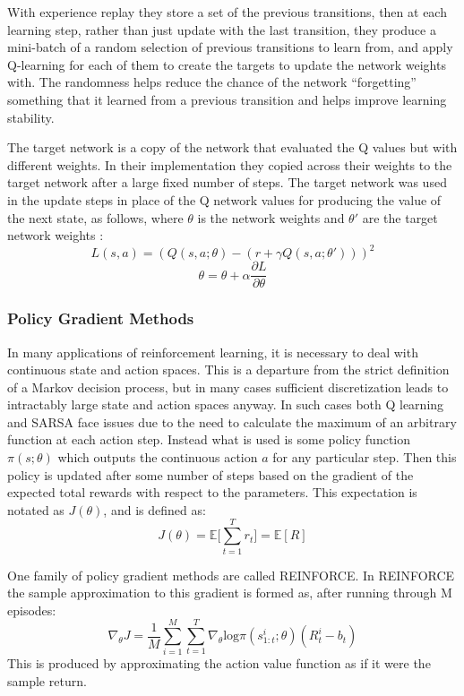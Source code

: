 With experience replay they store a set of the previous transitions, then at each learning step, rather than just update with the last transition, they produce a mini-batch of a random selection of previous transitions to learn from, and apply Q-learning for each of them to create the targets to update the network weights with. The randomness helps reduce the chance of the network ``forgetting'' something that it learned from a previous transition and helps improve learning stability. 

The target network is a copy of the network that evaluated the Q values  but with different weights. In their implementation they copied across their weights to the target network after a large fixed number of steps. The target network was used in the update steps in place of the Q network values for producing the value of the next state, as follows, where $\theta$ is the network weights and $\theta'$ are the target network weights :
\begin{equation*}
L(s,a) = (Q(s,a;\theta) - (r + \gamma Q(s,a; \theta' )))^2
\end{equation*}
\begin{equation}
\theta = \theta + \alpha \frac{\partial L}{\partial \theta}
\end{equation}

\subsubsection{Policy Gradient Methods}
In many applications of reinforcement learning, it is necessary to deal with continuous state and action spaces. This is a departure from the strict definition of a Markov decision process, but in many cases sufficient discretization leads to intractably large state and action spaces anyway. In such cases both Q learning and SARSA face issues due to the need to calculate the maximum of an arbitrary function at each action step. Instead what is used is some policy function $\pi(s;\theta)$ which outputs the continuous action $a$ for any particular step. Then this policy is updated after some number of steps based on the gradient of the expected total rewards with respect to the parameters. This expectation is notated as $J(\theta)$, and is defined as:
\begin{equation}
J(\theta) = \mathbb{E}\big[\sum_{t=1}^T r_t \big] = \mathbb{E}[R]
\end{equation}

One family of policy gradient methods are called REINFORCE. In REINFORCE the sample approximation to this gradient is formed as, after running through M episodes:
\begin{equation}
\nabla_\theta J = \frac{1}{M}\sum_{i=1}^M\sum_{t=1}^T\nabla_\theta  \text{log}\pi ( s_{1:t}^i ; \theta)(R^i_t - b_t)
\label{eq:Reinforce}
\end{equation}
This is produced by approximating the action value function as if it were the sample return.

